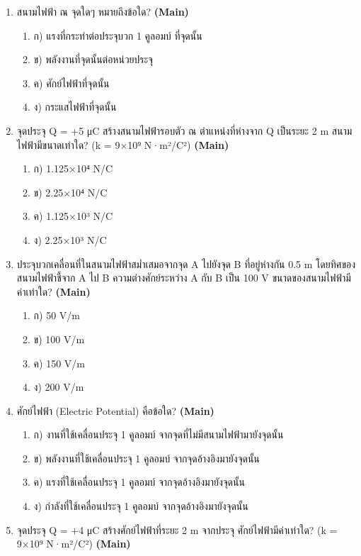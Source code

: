 \documentclass[12pt]{article}
\begin{document}
\begin{enumerate}[label=\arabic*.]
\begin{enumerate}[label=)]
\end{enumerate}
\item สนามไฟฟ้า ณ จุดใดๆ หมายถึงข้อใด? \hfill \textbf{\small (Main)}
\begin{enumerate}[label=)]
\item ก) แรงที่กระทำต่อประจุบวก 1 คูลอมบ์ ที่จุดนั้น
\item ข) พลังงานที่จุดนั้นต่อหน่วยประจุ
\item ค) ศักย์ไฟฟ้าที่จุดนั้น
\item ง) กระแสไฟฟ้าที่จุดนั้น
\end{enumerate}
\item จุดประจุ Q = +5 μC สร้างสนามไฟฟ้ารอบตัว ณ ตำแหน่งที่ห่างจาก Q เป็นระยะ 2 m สนามไฟฟ้ามีขนาดเท่าใด? (k = 9×10⁹ N·m²/C²) \hfill \textbf{\small (Main)}
\begin{enumerate}[label=)]
\item ก) 1.125×10⁴ N/C
\item ข) 2.25×10⁴ N/C
\item ค) 1.125×10³ N/C
\item ง) 2.25×10³ N/C
\end{enumerate}
\item ประจุบวกเคลื่อนที่ในสนามไฟฟ้าสม่ำเสมอจากจุด A ไปยังจุด B ที่อยู่ห่างกัน 0.5 m โดยทิศของสนามไฟฟ้าชี้จาก A ไป B ความต่างศักย์ระหว่าง A กับ B เป็น 100 V ขนาดของสนามไฟฟ้ามีค่าเท่าใด? \hfill \textbf{\small (Main)}
\begin{enumerate}[label=)]
\item ก) 50 V/m
\item ข) 100 V/m
\item ค) 150 V/m
\item ง) 200 V/m
\end{enumerate}
\item ศักย์ไฟฟ้า (Electric Potential) คือข้อใด? \hfill \textbf{\small (Main)}
\begin{enumerate}[label=)]
\item ก) งานที่ใช้เคลื่อนประจุ 1 คูลอมบ์ จากจุดที่ไม่มีสนามไฟฟ้ามายังจุดนั้น
\item ข) พลังงานที่ใช้เคลื่อนประจุ 1 คูลอมบ์ จากจุดอ้างอิงมายังจุดนั้น
\item ค) แรงที่ใช้เคลื่อนประจุ 1 คูลอมบ์ จากจุดอ้างอิงมายังจุดนั้น
\item ง) กำลังที่ใช้เคลื่อนประจุ 1 คูลอมบ์ จากจุดอ้างอิงมายังจุดนั้น
\end{enumerate}
\item จุดประจุ Q = +4 μC สร้างศักย์ไฟฟ้าที่ระยะ 2 m จากประจุ ศักย์ไฟฟ้ามีค่าเท่าใด? (k = 9×10⁹ N·m²/C²) \hfill \textbf{\small (Main)}

\end{enumerate}
\end{document}
